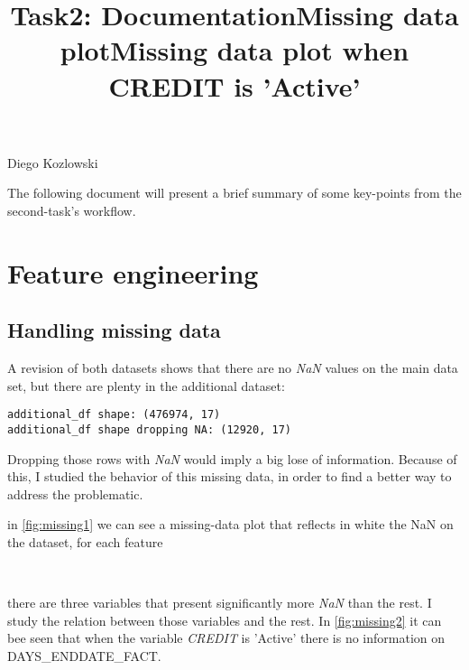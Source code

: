 \documentclass[11pt]{article}
\title{Task2: Documentation}
\begin{document}
    
    
    \maketitle
    \Large{Diego Kozlowski}
\normalsize

The following document will present a brief summary of some key-points from the second-task's workflow.    

\section{Feature engineering}

\subsection{Handling missing data}
  
A revision of both datasets shows that there are no \textit{NaN} values on the main data set, but there are plenty in the additional dataset: 
  
    \begin{Verbatim}[commandchars=\\\{\}]
additional_df shape: (476974, 17)
additional_df shape dropping NA: (12920, 17)

    \end{Verbatim}

Dropping those rows with \textit{NaN} would imply a big lose of information. Because of this, I studied the behavior of this missing data, in order to find a better way to address the problematic.

in \ref{fig:missing1} we can see a missing-data plot that reflects in white the NaN on the dataset, for each feature


    \begin{center}
    \title{Missing data plot}
    \label{fig:missing1}
    \end{center}
    { \hspace*{\fill} \\}
    
there are three variables that present significantly more \textit{NaN} than the rest. I study the relation between those variables and the rest. In \ref{fig:missing2} it can bee seen that when the variable \textit{CREDIT} is 'Active' there is no information on DAYS\_ENDDATE\_FACT.

    \begin{center}
    \title{Missing data plot when CREDIT is 'Active'}
    \label{fig:missing2}
    \end{center}
    { \hspace*{\fill} \\}
\end{document}
